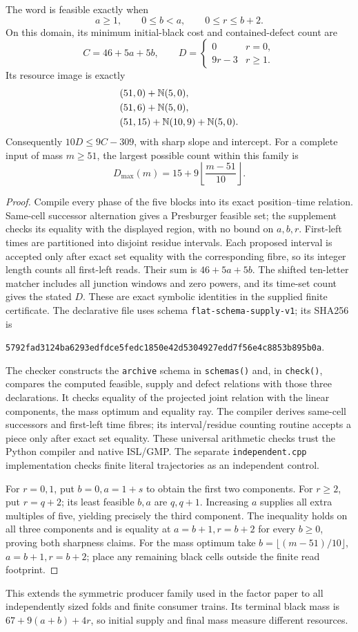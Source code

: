 \begin{theorem}\label{thm:supply}
The word is feasible exactly when
\[
 a\ge1,\qquad 0\le b<a,\qquad 0\le r\le b+2.
\]
On this domain, its minimum initial-black cost and contained-defect count are
\[
 C=46+5a+5b,\qquad
 D=\begin{cases}0&r=0,\\9r-3&r\ge1.\end{cases}
\]
Its resource image is exactly
\begin{align*}
 &(51,0)+\mathbb N(5,0),\\
 &(51,6)+\mathbb N(5,0),\\
 &(51,15)+\mathbb N(10,9)+\mathbb N(5,0).
\end{align*}
Consequently $10D\le9C-309$, with sharp slope and intercept. For a complete
input of mass $m\ge51$, the largest possible count within this family is
\[
 D_{\max}(m)=15+9\left\lfloor\frac{m-51}{10}\right\rfloor.
\]
\end{theorem}
\begin{proof}
Compile every phase of the five blocks into its exact position--time relation.
Same-cell successor alternation gives a Presburger feasible set; the supplement
checks its equality with the displayed region, with no bound on $a,b,r$.
First-left times are partitioned into disjoint residue intervals. Each proposed
interval is accepted only after exact set equality with the corresponding
fibre, so its integer length counts all first-left reads. Their sum is
$46+5a+5b$. The shifted ten-letter matcher includes all junction windows and
zero powers, and its time-set count gives the stated $D$. These are exact
symbolic identities in the supplied finite certificate.
The declarative file 
uses schema \texttt{flat-schema-supply-v1}; its SHA256 is
\begin{center}\scriptsize\texttt{5792fad3124ba6293edfdce5fedc1850e42d5304927edd7f56e4c8853b895b0a}.\end{center}
The checker  constructs the
\texttt{archive} schema in \texttt{schemas()} and, in \texttt{check()},
compares the computed feasible, supply and defect relations with those three
declarations. It checks equality of the projected joint relation with the
linear components, the mass optimum and equality ray. The compiler
 derives same-cell successors
and first-left time fibres; its interval/residue counting routine accepts a
piece only after exact set equality. These universal arithmetic checks trust
the Python compiler and native ISL/GMP. The separate \texttt{independent.cpp}
implementation checks finite literal trajectories as an independent control.

For $r=0,1$, put $b=0,a=1+s$ to obtain the first two components. For $r\ge2$,
put $r=q+2$; its least feasible $b,a$ are $q,q+1$. Increasing $a$ supplies
all extra multiples of five, yielding precisely the third component.
The inequality holds on all three components and is equality at
$a=b+1,r=b+2$ for every $b\ge0$, proving both sharpness claims.
For the mass optimum take $b=\lfloor(m-51)/10\rfloor$, $a=b+1,r=b+2$;
place any remaining black cells outside the finite read footprint.
\end{proof}
This extends the symmetric producer family used in the factor paper to all
independently sized folds and finite consumer trains. Its terminal black mass
is $67+9(a+b)+4r$, so initial supply and final mass measure different resources.
